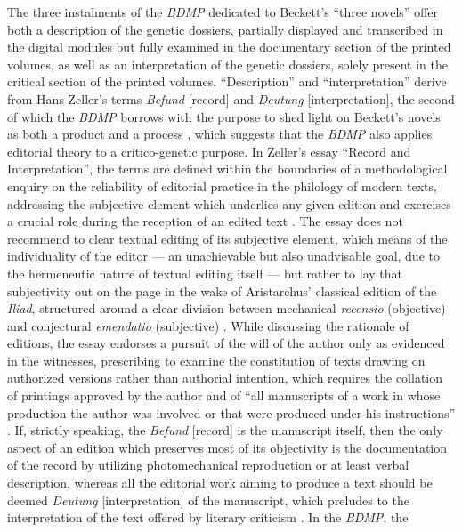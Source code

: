 \begin{paper}
The three instalments of the \emph{BDMP} dedicated to Beckett's ``three
novels'' offer both a description of the genetic dossiers, partially
displayed and transcribed in the digital modules but fully examined in
the documentary section of the printed volumes, as well as an
interpretation of the genetic dossiers, solely present in the critical section of the
printed volumes. ``Description'' and ``interpretation'' derive from
Hans Zeller's terms \emph{Befund} {[}record{]} and \emph{Deutung}
{[}interpretation{]}, the second of which the \emph{BDMP} borrows with
the purpose to shed light on Beckett's novels as both a product and a
process \citep[25]{oreilly_making_2017}, which suggests that the \emph{BDMP}
also applies editorial theory to a critico-genetic purpose. In Zeller's
essay ``Record and Interpretation'', the terms are defined within the
boundaries of a methodological enquiry on the reliability of editorial
practice in the philology of modern texts, addressing the subjective
element which underlies any given edition and exercises a crucial role
during the reception of an edited text \citep[18--20]{zeller_record_1995}. The essay
does not recommend to clear textual editing of its subjective element,
which means of the individuality of the editor --- an unachievable but
also unadvisable goal, due to the hermeneutic nature of textual editing
itself --- but rather to lay that subjectivity out on the page in the
wake of Aristarchus' classical edition of the \emph{Iliad}, structured
around a clear division between mechanical \emph{recensio} (objective)
and conjectural \emph{emendatio} (subjective) \citep[20--22]{zeller_record_1995}. While
discussing the rationale of editions, the essay endorses a pursuit of
the will of the author only as evidenced in the witnesses, prescribing
to examine the constitution of texts drawing on authorized versions
rather than authorial intention, which requires the collation of
printings approved by the author and of ``all manuscripts of a work in
whose production the author was involved or that were produced under his
instructions'' \citep[25--26 and 53n22]{zeller_record_1995}. If, strictly speaking,
the \emph{Befund} {[}record{]} is the manuscript itself, then the only
aspect of an edition which preserves most of its objectivity is the
documentation of the record by utilizing photomechanical reproduction or at
least verbal description, whereas all the editorial work aiming to
produce a text should be deemed \emph{Deutung} {[}interpretation{]} of
the manuscript, which preludes to the interpretation of the text offered
by literary criticism \citep[42--45]{zeller_record_1995}. In the \emph{BDMP}, the

\end{paper}
